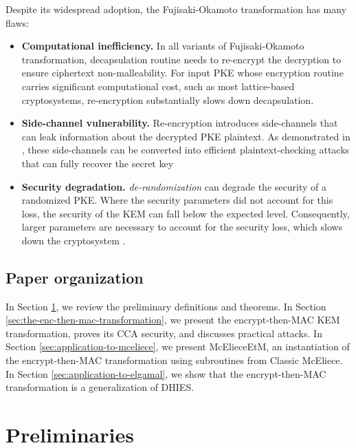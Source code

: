 \documentclass[runningheads]{llncs}
\begin{document}
Despite its widespread adoption, the Fujisaki-Okamoto transformation has many flaws: \begin{itemize}
    \item \textbf{Computational inefficiency.} In all variants of Fujisaki-Okamoto transformation, decapsulation routine needs to re-encrypt the decryption to ensure ciphertext non-malleability. For input PKE whose encryption routine carries significant computational cost, such as most lattice-based cryptosystems, re-encryption substantially slows down decapsulation.
    \item \textbf{Side-channel vulnerability.} Re-encryption introduces side-channels that can leak information about the decrypted PKE plaintext. As demonstrated in \cite{DBLP:journals/tches/UenoXTITH22,DBLP:journals/tches/TanakaUXITH23,DBLP:conf/acns/Huguenin-Dumittan20}, these side-channels can be converted into efficient plaintext-checking attacks that can fully recover the secret key
    \item \textbf{Security degradation.} \textit{de-randomization} can degrade the security of a randomized PKE. Where the security parameters did not account for this loss, the security of the KEM can fall below the expected level. Consequently, larger parameters are necessary to account for the security loss, which slows down the cryptosystem \cite{cryptoeprint:2021/912,DBLP:journals/iacr/Bernstein21}.
\end{itemize}

\subsection{Paper organization}\label{sec:paper-organization}
In Section \ref{sec:preliminaries}, we review the preliminary definitions and theorems. In Section \ref{sec:the-enc-then-mac-transformation}, we present the encrypt-then-MAC KEM transformation, proves its CCA security, and discusses practical attacks. In Section \ref{sec:application-to-mceliece}, we present McElieceEtM, an instantiation of the encrypt-then-MAC transformation using subroutines from Classic McEliece. In Section \ref{sec:application-to-elgamal}, we show that the encrypt-then-MAC transformation is a generalization of DHIES. 

\section{Preliminaries}\label{sec:preliminaries}
\end{document}
